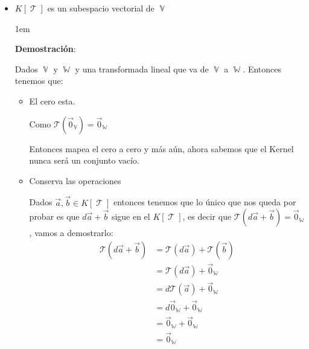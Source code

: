 \documentclass[12pt, fleqn]{report}                             %
\newenvironment{SmallIndentation}[1][0.75em]                    %
        {\begin{adjustwidth}{#1}{}\begin{footnotesize}}             %
        {\end{footnotesize}\end{adjustwidth}}                       %
\theoremstyle{break}                                            %
\DeclareMathOperator \VectorSet    {\mathbb{V}}                 %
\DeclareMathOperator \SubVectorSet {\mathbb{W}}                 %
\DeclareMathOperator \LinealTransformation {\mathcal{T}}        %
\newcommand{\Wrap}[1]    {\left( #1 \right)}                    %
\newcommand{\FnLinTrans}[1]{\mathcal{T}\Wrap{#1}}               %
\begin{document}
                \begin{itemize}
                    
                    \item $K[\LinealTransformation]$ es un subespacio vectorial
                        de $\VectorSet$

                        \begin{SmallIndentation}[1em]
                            \textbf{Demostración}:
                            
                            Dados $\VectorSet$ y $\SubVectorSet$ y una transformada lineal
                            que va de $\VectorSet$ a $\SubVectorSet$.
                            Entonces tenemos que:

                            \begin{itemize}
                                \item 
                                    El cero esta.

                                    Como $\FnLinTrans{\vec 0_{\VectorSet}} = \vec 0_{\SubVectorSet}$

                                    Entonces mapea el cero a cero y más aún, ahora sabemos que el Kernel nunca
                                    será un conjunto vacío.

                                \item 
                                    Conserva las operaciones

                                    Dados $\vec a, \vec b \in K[\LinealTransformation]$ entonces
                                    tenemos que lo único que nos queda por probar es que $d\vec a + \vec b$
                                    sigue en el $K[\LinealTransformation]$, es decir que 
                                    $\FnLinTrans{d\vec a + \vec b} = \vec 0_{\SubVectorSet}$,
                                    vamos a demostrarlo:
                                    \begin{align*}
                                        \FnLinTrans{d\vec a + \vec b}
                                            &= \FnLinTrans{d\vec a} + \FnLinTrans{\vec b}       \\
                                            &= \FnLinTrans{d\vec a} + \vec 0_{\SubVectorSet}    \\
                                            &= d\FnLinTrans{\vec a} + \vec 0_{\SubVectorSet}    \\
                                            &= d\vec 0_{\SubVectorSet} + \vec 0_{\SubVectorSet} \\
                                            &= \vec 0_{\SubVectorSet} + \vec 0_{\SubVectorSet}  \\
                                            &= \vec 0_{\SubVectorSet}
                                    \end{align*}


\end{itemize}
\end{SmallIndentation}
\end{itemize}
\end{document}
